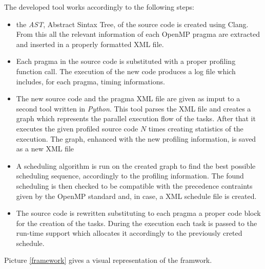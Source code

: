 \documentclass[a4paper,12pt,oneside]{book}
\begin{document}
The developed tool works accordingly to the following steps:
\begin{itemize}
\item{the \emph{AST}, Abstract Sintax Tree, of the source code is created using Clang. From this all the relevant information of each OpenMP pragma are extracted and inserted in a properly formatted XML file.}
\item{Each pragma in the source code is substituted with a proper profiling function call. The execution of the new code produces a log file which includes, for each pragma, timing informations.  }
\item{The new source code and the pragma XML file are given as imput to a second tool written in \emph{Python}. This tool parses the XML file and creates a graph which represents the parallel execution flow of the tasks. After that it executes the given profiled source code $N$ times creating statistics of the execution. The graph, enhanced with the new profiling information, is saved as a new XML file}
\item{ A scheduling algorithm is run on the created graph to find the best possible scheduling sequence, accordingly to the profiling information. The found scheduling is then checked to be compatible with the precedence contraints given by the OpenMP standard and, in case, a XML schedule file is created.}
\item{ The source code is rewritten substituting to each pragma a proper code block for the creation of the tasks. During the execution each task is passed to the run-time support which allocates it accordingly to the previously creted schedule.}
\end{itemize}

Picture \ref{framework} gives a visual representation of the framwork.
\end{document}
